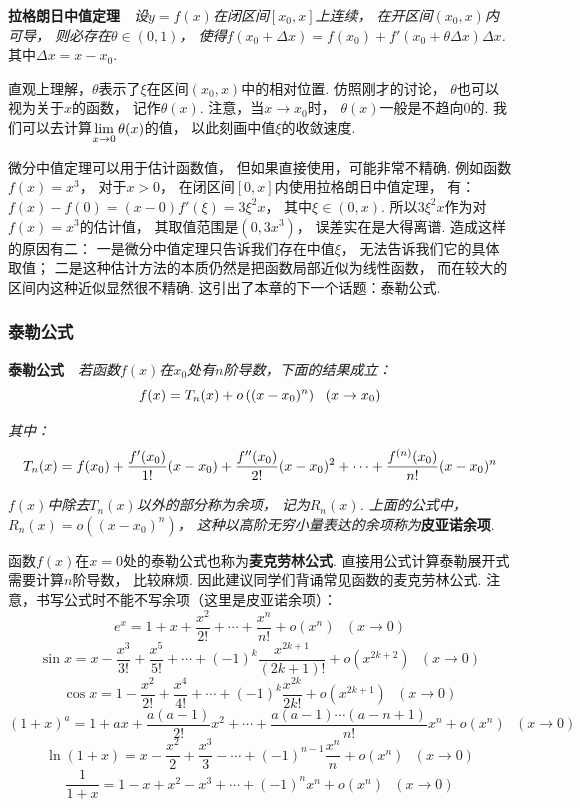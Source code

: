 \textbf{拉格朗日中值定理}~~\textit{设$y=f(x)$在闭区间$[x_0,x]$上连续，
在开区间$(x_0,x)$内可导，
则必存在$\theta \in (0,1)$，
使得$f(x_0+\Delta x) = f(x_0)+f'(x_0+\theta \Delta x)\Delta x$. }
其中$\Delta x = x - x_0$.  \par \vspace{1em}

直观上理解，$\theta$表示了$\xi$在区间$(x_0,x)$中的相对位置.
仿照刚才的讨论，
$\theta$也可以视为关于$x$的函数，
记作$\theta(x)$.
注意，当$x \to x_0$时，
$\theta(x)$一般是不趋向$0$的.
我们可以去计算$\limx0 \theta(x)$的值，
以此刻画中值$\xi$的收敛速度.\vspace{1em}

微分中值定理可以用于估计函数值，
但如果直接使用，可能非常不精确.
例如函数$f(x)=x^3$，
对于$x>0$，
在闭区间$[0,x]$内使用拉格朗日中值定理，
有：
$f(x)-f(0)=(x-0)f'(\xi)=3\xi^2 x$，
其中$\xi \in (0,x)$.
所以$3\xi^2 x$作为对$f(x)=x^3$的估计值，
其取值范围是$(0,3x^3)$，
误差实在是大得离谱.
造成这样的原因有二：
一是微分中值定理只告诉我们存在中值$\xi$，
无法告诉我们它的具体取值；
二是这种估计方法的本质仍然是把函数局部近似为线性函数，
而在较大的区间内这种近似显然很不精确.
这引出了本章的下一个话题：泰勒公式.\par

\subsubsection{泰勒公式} \par
\textbf{泰勒公式}~~\textit{若函数$f(x)$在$x_0$处有$n$阶导数，下面的结果成立：}
$$
\setlength\abovedisplayskip{6pt}
    \setlength\belowdisplayskip{6pt}
f(x)=T_{n}(x)+o\left((x-x_0)^n\right) ~~(x \to x_0)
$$

\textit{其中：}
$$
\setlength\abovedisplayskip{6pt}
    \setlength\belowdisplayskip{6pt}
T_{n}(x) = f(x_0) + \frac{f'(x_0)}{1!}(x-x_0) + \frac{f''(x_0)}{2!}(x-x_0)^2 + \cdots + \frac{f^{(n)}(x_0)}{n!}(x-x_0)^n
$$\par
\textit{$f(x)$中除去$T_{n}(x)$以外的部分称为余项，
记为$R_{n}(x)$.
上面的公式中，$R_{n}(x)=o\left((x-x_0)^n\right)$，
这种以高阶无穷小量表达的余项称为}\textbf{皮亚诺余项}.\par \vspace{1em}

函数$f(x)$在$x=0$处的泰勒公式也称为\textbf{麦克劳林公式}. 直接用公式计算泰勒展开式需要计算$n$阶导数，
比较麻烦.
因此建议同学们背诵常见函数的麦克劳林公式.
注意，书写公式时不能不写余项（这里是皮亚诺余项）：
$$
e^x = 1 + x +\frac{x^2}{2!} + \cdots +\frac{x^n}{n!} + o(x^n)~~~(x \to 0)
$$
$$
\sin x = x - \frac{x^3}{3!} + \frac{x^5}{5!} + \cdots + (-1)^{k}\frac{x^{2k+1}}{(2k+1)!} +o(x^{2k+2}) ~~~(x \to 0)
$$
$$
\cos x = 1 -\frac{x^2}{2!} + \frac{x^4}{4!} +\cdots + (-1)^{k} \frac{x^{2k}}{2k!} + o(x^{2k+1}) ~~~(x \to 0)
$$
$$
(1+x)^a = 1 + ax + \frac{a(a-1)}{2!}x^2 + \cdots + \frac{a(a-1)\cdots (a-n+1)}{n!}x^n + o(x^n) ~~~(x \to 0)
$$
$$
\ln (1+x) = x - \frac{x^2}{2} + \frac{x^3}{3} - \cdots +(-1)^{n-1} \frac{x^n}{n} + o(x^n) ~~~(x \to 0)
$$
$$
\frac{1}{1+x} = 1 - x + x^2 -x^3 + \cdots +(-1)^{n}x^n + o(x^n) ~~~(x \to 0)
$$

